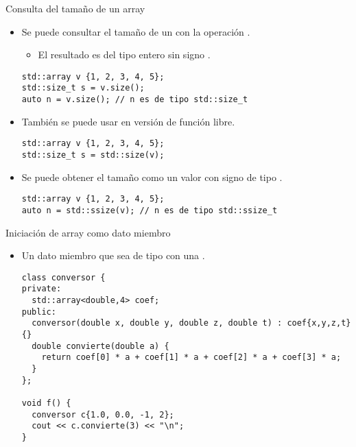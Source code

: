 \begin{frame}[t,fragile]{Consulta del tamaño de un array}
\begin{itemize}
  \item Se puede consultar el tamaño de un  con la 
        operación .
    \begin{itemize}
      \item El resultado es del tipo entero sin signo .
    \end{itemize}
\begin{lstlisting}
std::array v {1, 2, 3, 4, 5};
std::size_t s = v.size();
auto n = v.size(); // n es de tipo std::size_t
\end{lstlisting}

  \item También se puede usar en versión de función libre.
\begin{lstlisting}
std::array v {1, 2, 3, 4, 5};
std::size_t s = std::size(v);
\end{lstlisting}

  \item Se puede obtener el tamaño como un valor con signo de tipo .
\begin{lstlisting}
std::array v {1, 2, 3, 4, 5};
auto n = std::ssize(v); // n es de tipo std::ssize_t
\end{lstlisting}
\end{itemize}
\end{frame}

\begin{frame}[t,fragile]{Iniciación de array como dato miembro}
\begin{itemize}
  \item Un dato miembro que sea de tipo   
        con una .
\begin{lstlisting}
class conversor {
private:
  std::array<double,4> coef;
public:
  conversor(double x, double y, double z, double t) : coef{x,y,z,t} {}
  double convierte(double a) {
    return coef[0] * a + coef[1] * a + coef[2] * a + coef[3] * a;
  }
};

void f() {
  conversor c{1.0, 0.0, -1, 2};
  cout << c.convierte(3) << "\n";
}
\end{lstlisting}
\end{itemize}
\end{frame}
